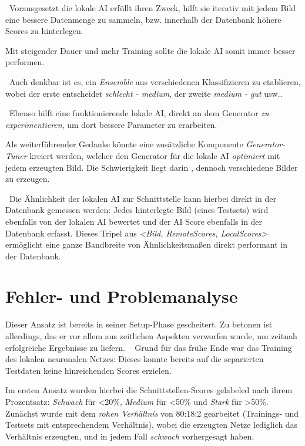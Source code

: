  ~\newline Vorausgesetzt die lokale AI erfüllt ihren Zweck, hilft sie iterativ mit jedem Bild eine bessere Datenmenge zu sammeln, bzw. innerhalb der Datenbank höhere Scores zu hinterlegen. 
 
 Mit steigender Dauer und mehr Training sollte die lokale AI somit immer besser performen. 
 
 ~\newline Auch denkbar ist es, ein \textit{Ensemble} aus verschiedenen Klassifizieren zu etablieren, wobei der erste entscheidet \textit{schlecht - medium}, der zweite \textit{medium - gut} usw..
 
 ~\newline Ebenso hilft eine funktionierende lokale AI, direkt an dem Generator \textit{zu experimentieren}, um dort bessere Parameter zu erarbeiten. 
 
 Als weiterführender Gedanke könnte eine zusätzliche Komponente \textit{Generator-Tuner} kreiert werden, welcher den Generator für die lokale AI \textit{optimiert} mit jedem erzeugten Bild. 
 Die Schwierigkeit liegt darin , dennoch verschiedene Bilder zu erzeugen. 
 
 ~\newline Die Ähnlichkeit der lokalen AI zur Schnittstelle kann hierbei direkt in der Datenbank gemessen werden: Jedes hinterlegte Bild (eines Testsets) wird ebenfalls von der lokalen AI bewertet und der AI Score ebenfalls in der Datenbank erfasst. 
 Dieses Tripel aus \textit{<Bild, RemoteScores, LocalScores>} ermöglicht eine ganze Bandbreite von Ähnlichkeitsmaßen direkt performant in der Datenbank.  
\newpage
\section{Fehler- und Problemanalyse}
\label{sec:ProblemGreyBoxing}
Dieser Ansatz ist bereits in seiner Setup-Phase gescheitert. Zu betonen ist allerdings, das er vor allem aus zeitlichen Aspekten verworfen wurde, um zeitnah erfolgreiche Ergebnisse zu liefern.
~\newline
Grund für das frühe Ende war das Training des lokalen neuronalen Netzes: Dieses konnte bereits auf die separierten Testdaten keine hinreichenden Scores erzielen. 

Im ersten Ansatz wurden hierbei die Schnittstellen-Scores gelabeled nach ihrem Prozentsatz: \textit{Schwach} für <20\%, \textit{Medium} für <50\% und \textit{Stark} für >50\%. Zunächst wurde mit dem \textit{rohen Verhältnis} von 80:18:2 gearbeitet (Trainings- und Testsets mit entsprechendem Verhältnis), wobei die erzeugten Netze lediglich das Verhältnis erzeugten, und in jedem Fall \textit{schwach} vorhergesagt haben. 


